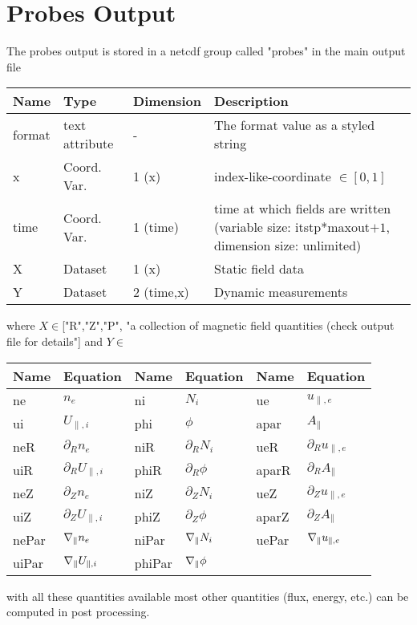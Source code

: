 \section{Probes Output}\label{sec:probes-output}
The probes output is stored in a netcdf group called "probes" in the main output file
%
\begin{longtable}{lll>{\RaggedRight}p{7cm}}
\toprule
\rowcolor{gray!50}\textbf{Name} &  \textbf{Type} & \textbf{Dimension} & \textbf{Description}  \\ \midrule
format           & text attribute   & - & The format value as a styled string \\
x                & Coord. Var. & 1 (x) & index-like-coordinate $\in [0,1]$ \\
time             & Coord. Var. & 1 (time)& time at which fields are written (variable size: itstp*maxout$+1$, dimension size: unlimited) \\
X                & Dataset & 1 (x) & Static field data \\
Y                & Dataset & 2 (time,x) & Dynamic measurements \\
\bottomrule
\end{longtable}
where $X\in $["R","Z","P", "a collection of magnetic field quantities (check output file for details"]
    and $Y\in $
\begin{longtable}{llllll}
\toprule
\rowcolor{gray!50}\textbf{Name} &  \textbf{Equation} & \textbf{Name} &  \textbf{Equation} & \textbf{Name} & \textbf{Equation}\\
\midrule
    ne &$n_e$ &
    ni &$N_i$ &
    ue &$u_{\parallel,e}$ \\
    ui &$U_{\parallel,i}$ &
    phi &$\phi$ &
    apar &$A_\parallel$ \\
    neR &$\partial_R n_e$ &
    niR &$\partial_R N_i$ &
    ueR &$\partial_R u_{\parallel,e}$ \\
    uiR &$\partial_R U_{\parallel,i}$ &
    phiR &$\partial_R \phi$ &
    aparR &$\partial_R A_\parallel$ \\
    neZ &$\partial_Z n_e$ &
    niZ &$\partial_Z N_i$ &
    ueZ &$\partial_Z u_{\parallel,e}$ \\
    uiZ &$\partial_Z U_{\parallel,i}$ &
    phiZ &$\partial_Z \phi$ &
    aparZ &$\partial_Z A_\parallel$ \\
    nePar &$\nabla_\parallel n_e$ &
    niPar &$\nabla_\parallel N_i$ &
    uePar &$\nabla_\parallel u_{\parallel,e}$ \\
    uiPar &$\nabla_\parallel U_{\parallel,i}$ &
    phiPar &$\nabla_\parallel \phi$ &
     & \\
\bottomrule
\end{longtable}
with all these quantities available most other quantities (flux, energy, etc.)
can be computed in post processing.


